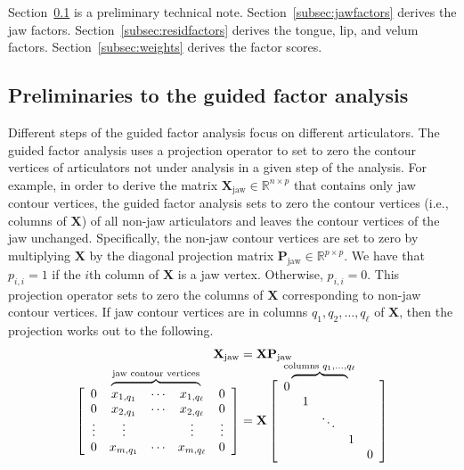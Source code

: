 \documentclass[preprint]{JASAnew}
\newcommand\bovermat[2]{%
  \makebox[0pt][l]{$\smash{\overbrace{\phantom{%
    \begin{matrix}#2\end{matrix}}}^{#1}}$}#2}
\begin{document}
Section~\ref{subsec:preliminaries} is a preliminary technical note. Section~\ref{subsec:jawfactors} derives the jaw factors. Section~\ref{subsec:residfactors} derives the tongue, lip, and velum factors. Section~\ref{subsec:weights} derives the factor scores. 





\subsection{Preliminaries to the guided factor analysis}
\label{subsec:preliminaries}

Different steps of the guided factor analysis focus on different articulators.
%
The guided factor analysis uses a projection operator to set to zero the contour vertices of articulators not under analysis in a given step of the analysis.
% 
For example, in order to derive the matrix $\mathbf{X}_\text{jaw} \in \mathbb{R}^{n\times p}$ that contains only jaw contour vertices, the guided factor analysis sets to zero the contour vertices (i.e., columns of $\mathbf{X}$) of all non-jaw articulators and leaves the contour vertices of the jaw unchanged. 
%
Specifically, the non-jaw contour vertices are set to zero by multiplying $\mathbf{X}$  
% 
by the diagonal projection matrix $\mathbf{P}_\text{jaw} \in \mathbb{R}^{p\times p}$. 
% 
We have that $p_{i,i}=1$ if the $i$th column of $\mathbf{X}$ is a jaw vertex. Otherwise, $p_{i,i}=0$. 
% 
This projection operator sets to zero the columns of $\mathbf{X}$ corresponding to non-jaw contour vertices. 
% 
If jaw contour vertices are in columns $q_1,q_2,\ldots,q_\ell$ of $\mathbf{X}$, then the projection works out to the following. 
% 
\begin{equation}
\begin{split}
  \mathbf{X}_\text{jaw} &= \mathbf{X} \mathbf{P}_\text{jaw} \\[10pt]
%
  \left[ {\begin{array}{ccccc}
   0 & \bovermat{\text{jaw contour vertices}}{x_{1,q_1} &  \cdots & x_{1,q_\ell}} & 0 \\
   0 & x_{2,q_1} &  \cdots & x_{2,q_\ell} & 0 \\
   \vdots & \vdots & & \vdots & \vdots \\
   0 & x_{m,q_1} & \cdots & x_{m,q_\ell} & 0 \\
  \end{array} } \right]
%
  &= 
%
   \mathbf{X}
%
   \left[ {\begin{array}{ccccc}
   \bovermat{\text{columns } q_1,\ldots,q_\ell}{0&&&&}\\
   & 1 &&&\\
   && \ddots &&\\
   &&& 1 &\\
   &&&& 0 \\
  \end{array} } \right]
\end{split}
\end{equation}
\end{document}
